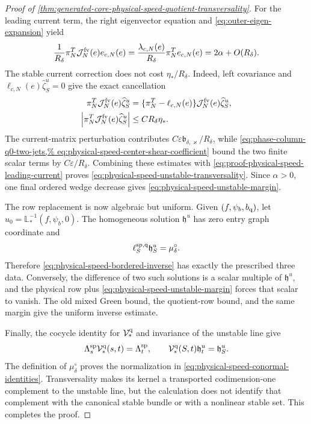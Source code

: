 \begin{proof}[Proof of
\cref{thm:generated-core-physical-speed-quotient-transversality}]
For the leading current term, the right eigenvector equation and
\cref{eq:outer-eigen-expansion} yield
\begin{equation}
 \frac1{R_\delta}\pi_N^T
     \mathcal J_N^{\rm fv}(e)e_{c,N}(e)
 =\frac{\lambda_{c,N}(e)}{R_\delta}
       \pi_N^Te_{c,N}(e)
 =2\alpha+O(R_\delta).                         \label{eq:proof-physical-speed-leading-current}
\end{equation}
The stable current correction does not cost
\(\eta_*/R_\delta\).  Indeed, left covariance and
\(\ell_{c,N}(e)\widehat\zeta_S^u=0\) give the exact cancellation
\begin{align}
 \pi_N^T\mathcal J_N^{\rm fv}(e)\widehat\zeta_S^u
 &=\{\pi_N^T-\ell_{c,N}(e)\}
       \mathcal J_N^{\rm fv}(e)\widehat\zeta_S^u,\notag\\
 \left|\pi_N^T\mathcal J_N^{\rm fv}(e)
       \widehat\zeta_S^u\right|
 &\le CR_\delta\eta_* .                       \label{eq:proof-physical-speed-left-covector-cancellation}
\end{align}
The current-matrix perturbation contributes
\(C\varepsilon\mathfrak b_{\delta,\varkappa}/R_\delta\), while
\cref{eq:phase-column-q0-two-jets,%
eq:physical-speed-center-shear-coefficient}
bound the two finite scalar terms by \(C\varepsilon/R_\delta\).
Combining these estimates with
\cref{eq:proof-physical-speed-leading-current} proves
\cref{eq:physical-speed-unstable-transversality}.  Since \(\alpha>0\),
one final ordered wedge decrease gives
\cref{eq:physical-speed-unstable-margin}.

The row replacement is now algebraic but uniform.  Given
\((f,\psi_b,b_{\rm q})\), let
\(u_0=\mathbb L_*^{-1}(f,\psi_b,0)\).  The homogeneous solution
\(\mathfrak h^u\) has zero entry graph coordinate and
\[
 \ell_S^{\rm sp,q}\mathfrak h_S^u=\mu_\delta^\circ.
\]
Therefore \cref{eq:physical-speed-bordered-inverse} has exactly the
prescribed three data.  Conversely, the difference of two such solutions
is a scalar multiple of \(\mathfrak h^u\), and the physical row plus
\cref{eq:physical-speed-unstable-margin} forces that scalar to vanish.
The old mixed Green bound, the quotient-row bound, and the same margin give
the uniform inverse estimate.

Finally, the cocycle identity for \(\mathcal V_*^{\rm q}\) and invariance
of the unstable line give
\[
 \Lambda_s^{\rm sp}\mathcal V_*^{\rm q}(s,t)
 =\Lambda_t^{\rm sp},
 \qquad
 \mathcal V_*^{\rm q}(S,t)\mathfrak h_t^u=\mathfrak h_S^u.
\]
The definition of \(\mu_\delta^\circ\) proves the normalization in
\cref{eq:physical-speed-conormal-identities}.  Transversality makes its
kernel a transported codimension-one complement to the unstable line, but
the calculation does not identify that complement with the canonical
stable bundle or with a nonlinear stable set.  This completes the proof.
\end{proof}

